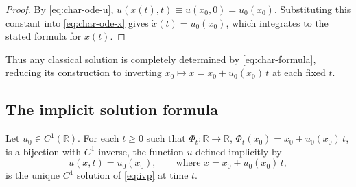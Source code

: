 \begin{proof}
By \eqref{eq:char-ode-u}, $u(x(t),t) \equiv u(x_0,0) = u_0(x_0)$.
Substituting this constant into \eqref{eq:char-ode-x} gives $\dot x(t) =
u_0(x_0)$, which integrates to the stated formula for $x(t)$.
\end{proof}

Thus any classical solution is completely determined by
\eqref{eq:char-formula}, reducing its construction to inverting $x_0
\mapsto x = x_0 + u_0(x_0)\, t$ at each fixed $t$.

\subsection{The implicit solution formula}
\label{subsec:char-implicit-formula}

\begin{theorem}
\label{thm:implicit-solution}
Let $u_0 \in C^1(\mathbb{R})$. For each $t \geq 0$ such that $\Phi_t :
\mathbb{R} \to \mathbb{R}$, $\Phi_t(x_0) = x_0 + u_0(x_0)\, t$, is a
bijection with $C^1$ inverse, the function $u$ defined implicitly by
\begin{equation}
  \label{eq:implicit-solution}
  u(x,t) = u_0(x_0), \qquad \text{where } x = x_0 + u_0(x_0)\, t,
\end{equation}
is the unique $C^1$ solution of \eqref{eq:ivp} at time $t$.
\end{theorem}

